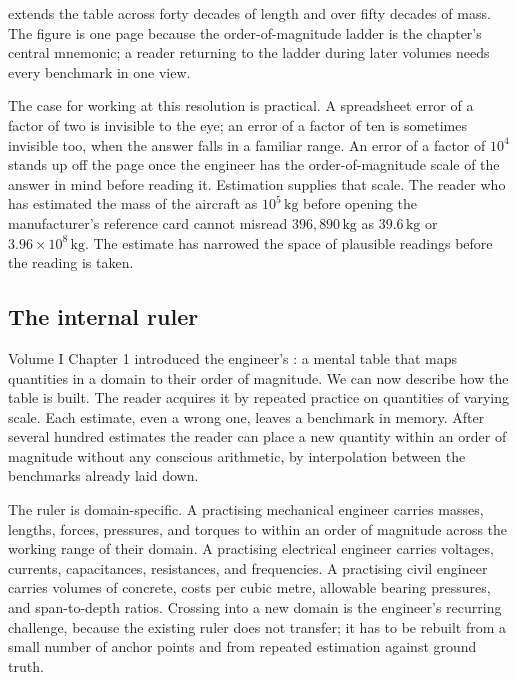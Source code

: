  extends the table across forty
decades of length and over fifty decades of mass. The figure is one
page because the order-of-magnitude ladder is the chapter's central
mnemonic; a reader returning to the ladder during later volumes
needs every benchmark in one view.



The case for working at this resolution is practical. A spreadsheet error
of a factor of two is invisible to the eye; an error of a factor of ten
is sometimes invisible too, when the answer falls in a familiar range. An
error of a factor of $10^{4}$ stands up off the page once the engineer
has the order-of-magnitude scale of the answer in mind before reading
it. Estimation supplies that scale. The reader who has estimated the
mass of the aircraft as $10^{5} \,\si{\kilogram}$ before opening the
manufacturer's reference card cannot misread $396{,}890 \,\si{\kilogram}$
as $39.6 \,\si{\kilogram}$ or $3.96 \times 10^{8} \,\si{\kilogram}$. The
estimate has narrowed the space of plausible readings before the reading
is taken.

\subsection{The internal ruler}

Volume I Chapter 1 introduced the engineer's : a
mental table that maps quantities in a domain to their order of
magnitude. We can now describe how the table is built. The reader
acquires it by repeated practice on quantities of varying scale. Each
estimate, even a wrong one, leaves a benchmark in memory. After several
hundred estimates the reader can place a new quantity within an order of
magnitude without any conscious arithmetic, by interpolation between the
benchmarks already laid down.

The ruler is domain-specific. A practising mechanical engineer carries
masses, lengths, forces, pressures, and torques to within an order of
magnitude across the working range of their domain. A practising
electrical engineer carries voltages, currents, capacitances,
resistances, and frequencies. A practising civil engineer carries
volumes of concrete, costs per cubic metre, allowable bearing pressures,
and span-to-depth ratios. Crossing into a new domain is the engineer's
recurring challenge, because the existing ruler does not transfer; it has
to be rebuilt from a small number of anchor points and from repeated
estimation against ground truth.


